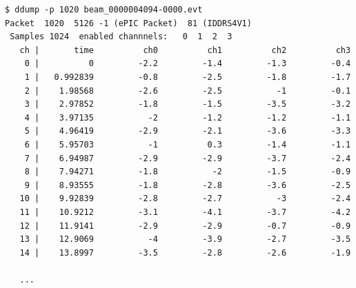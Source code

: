 \documentclass{article}[11pt]
\begin{document}
\begin{verbatim}
$ ddump -p 1020 beam_0000004094-0000.evt
Packet  1020  5126 -1 (ePIC Packet)  81 (IDDRS4V1)
 Samples 1024  enabled channnels:   0  1  2  3
   ch |       time          ch0          ch1          ch2          ch3
    0 |          0         -2.2         -1.4         -1.3         -0.4
    1 |   0.992839         -0.8         -2.5         -1.8         -1.7
    2 |    1.98568         -2.6         -2.5           -1         -0.1
    3 |    2.97852         -1.8         -1.5         -3.5         -3.2
    4 |    3.97135           -2         -1.2         -1.2         -1.1
    5 |    4.96419         -2.9         -2.1         -3.6         -3.3
    6 |    5.95703           -1          0.3         -1.4         -1.1
    7 |    6.94987         -2.9         -2.9         -3.7         -2.4
    8 |    7.94271         -1.8           -2         -1.5         -0.9
    9 |    8.93555         -1.8         -2.8         -3.6         -2.5
   10 |    9.92839         -2.8         -2.7           -3         -2.4
   11 |    10.9212         -3.1         -4.1         -3.7         -4.2
   12 |    11.9141         -2.9         -2.9         -0.7         -0.9
   13 |    12.9069           -4         -3.9         -2.7         -3.5
   14 |    13.8997         -3.5         -2.8         -2.6         -1.9

   ...


\end{verbatim}
\end{document}
